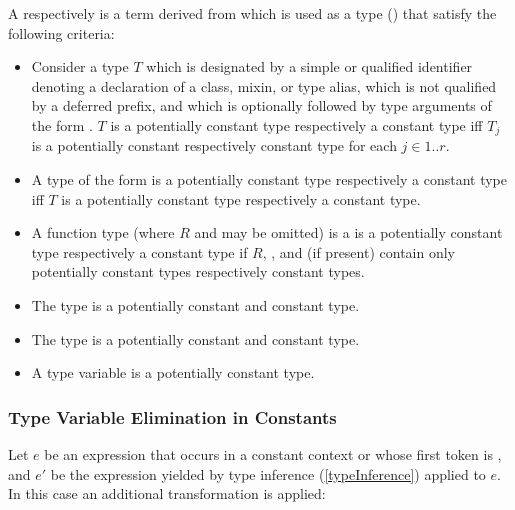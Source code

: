 \documentclass[makeidx]{article}
\begin{document}
{\LMHash{}%
A  respectively 
is a term derived from  which is used as a type
()
that satisfy the following criteria:
\begin{itemize}
\item
  Consider a type $T$
  which is designated by a simple or qualified identifier
  denoting a declaration of a class, mixin, or type alias,
  which is not qualified by a deferred prefix,
  and which is optionally followed by
  type arguments of the form .
  $T$ is a potentially constant type respectively a constant type
  if{}f $T_j$ is a potentially constant respectively constant type
  for each $j \in 1 .. r$.
\item
  A type of the form 
  is a potentially constant type
  respectively a constant type
  if{}f $T$ is a potentially constant type
  respectively a constant type.
\item
  A function type
  (where $R$ and  may be omitted)
  is a is a potentially constant type
  respectively a constant type
  if $R$, , and 
  (if present) contain only potentially constant types
  respectively constant types.
\item
  The type \VOID{} is a potentially constant and constant type.
\item
  The type \DYNAMIC{} is a potentially constant and constant type.
\item
  A type variable is a potentially constant type.
\end{itemize}


\subsubsection{Type Variable Elimination in Constants}

\LMHash{}%
%
Let $e$ be an expression that occurs in a constant context
or whose first token is \CONST,
and $e'$ be the expression yielded by type inference
(\ref{typeInference})
applied to $e$.
In this case an additional transformation is applied:

}
\end{document}
